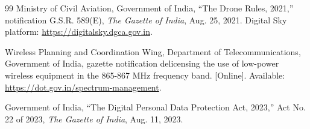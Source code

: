 \documentclass[journal]{IEEEtran}
\begin{document}
\begin{thebibliography}{99}
Ministry of Civil Aviation, Government of India, ``The Drone Rules, 2021,''
notification G.S.R. 589(E), \emph{The Gazette of India}, Aug. 25, 2021.
Digital Sky platform: \url{https://digitalsky.dgca.gov.in}.

Wireless Planning and Coordination Wing, Department of Telecommunications,
Government of India, gazette notification delicensing the use of low-power
wireless equipment in the 865-867 MHz frequency band. [Online]. Available:
\url{https://dot.gov.in/spectrum-management}.

Government of India, ``The Digital Personal Data Protection Act, 2023,'' Act
No. 22 of 2023, \emph{The Gazette of India}, Aug. 11, 2023.

\end{thebibliography}
\end{document}
